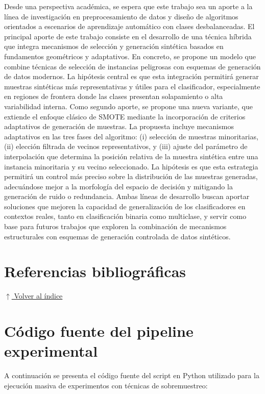 \documentclass[12pt,a4paper]{article}
\begin{document}
Desde una perspectiva académica, se espera que este trabajo sea un aporte a la línea de investigación en preprocesamiento de datos y diseño de algoritmos orientados a escenarios de aprendizaje automático con clases desbalanceadas. 
El principal aporte de este trabajo consiste en el desarrollo de una técnica híbrida que integra mecanismos de selección y generación sintética basados en fundamentos geométricos y adaptativos. En concreto, se propone un modelo que combine técnicas de selección de instancias peligrosas con esquemas de generación de datos modernos. La hipótesis central es que esta integración permitirá generar muestras sintéticas más representativas y útiles para el clasificador, especialmente en regiones de frontera donde las clases presentan solapamiento o alta variabilidad interna.
Como segundo aporte, se propone una nueva variante, que extiende el enfoque clásico de SMOTE mediante la incorporación de criterios adaptativos de generación de muestras. La propuesta incluye mecanismos adaptativos en las tres fases del algoritmo: (i) selección de muestras minoritarias, (ii) elección filtrada de vecinos representativos, y (iii) ajuste del parámetro de interpolación que determina la posición relativa de la muestra sintética entre una instancia minoritaria y su vecino seleccionado. La hipótesis es que esta estrategia permitirá un control más preciso sobre la distribución de las muestras generadas, adecuándose mejor a la morfología del espacio de decisión y mitigando la generación de ruido o redundancia.
Ambas líneas de desarrollo buscan aportar soluciones que mejoren la capacidad de generalización de los clasificadores en contextos reales, tanto en clasificación binaria como multiclase, y servir como base para futuros trabajos que exploren la combinación de mecanismos estructurales con esquemas de generación controlada de datos sintéticos.

\section{Referencias bibliográficas} \noindent\hyperlink{toc}{\small$\uparrow$ Volver al índice}
\printbibliography

\appendix

\section{Código fuente del pipeline experimental}
\label{apendice:codigo_pipeline}

A continuación se presenta el código fuente del script en Python utilizado para la ejecución masiva de experimentos con técnicas de sobremuestreo:


\end{document}

